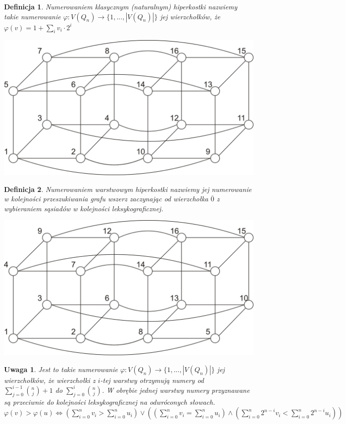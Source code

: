 \documentclass{pracamgr}
\newtheorem{defi}{Definicja}[section] %
\newtheorem{remark}[theorem]{Uwaga}
\begin{document}
   \begin{defi}\label{numerowanie klasyczne}
    \emph{Numerowaniem klasycznym (naturalnym)} hiperkostki nazwiemy takie numerowanie $\varphi:V(Q_n)\rightarrow\{1,...,|V(Q_n)|\}$ jej wierzchołków, że
    $\varphi(v)=1+\sum_{i}v_i\cdot2^i$
   \end{defi}
   \begin{center}
    \includegraphics[scale=0.6]{img/Q_4_klasyczne.jpg}
   \end{center}
   \begin{defi}\label{numerowanie warstwowe}%
   \emph{Numerowaniem warstwowym} hiperkostki nazwiemy jej numerowanie w kolejności przeszukiwania grafu wszerz zaczynając od wierzchołka $\overline{0}$
   z wybieraniem sąsiadów w kolejności leksykograficznej.
   \end{defi}
   \begin{center}
    \includegraphics[scale=0.6]{img/Q_4_warstwowe.jpg}
   \end{center}   
   \begin{remark}\label{numerowanie warstwowe 2}
    Jest to takie numerowanie $\varphi:V(Q_n)\rightarrow\{1,...,|V(Q_n)|\}$ jej wierzchołków,
    że wierzchołki z $i$-tej warstwy otrzymują numery od $\sum_{j=0}^{i-1}{n\choose j}+1$ do $\sum_{j=0}^{i}{n\choose j}$.
    W obrębie jednej warstwy numery przyznawane są przeciwnie do kolejności leksykograficznej na odwróconych słowach.
    $\varphi(v)>\varphi(u)\Leftrightarrow (\sum_{i=0}^n v_i>\sum_{i=0}^n u_i)
    \vee((\sum_{i=0}^n v_i=\sum_{i=0}^n u_i)\wedge(\sum_{i=0}^n2^{n-i}v_i<\sum_{i=0}^n2^{n-i}u_i))$
   \end{remark}
\end{document}
